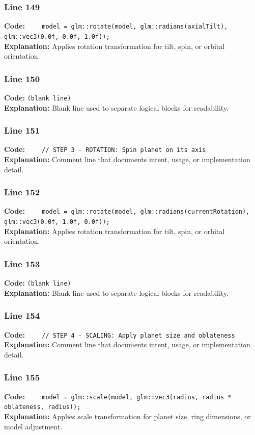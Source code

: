 \documentclass[11pt,a4paper]{article}
\begin{document}
\subsubsection*{Line 149}
\textbf{Code:} \verb|    model = glm::rotate(model, glm::radians(axialTilt), glm::vec3(0.0f, 0.0f, 1.0f));|\\
\textbf{Explanation:} Applies rotation transformation for tilt, spin, or orbital orientation.

\subsubsection*{Line 150}
\textbf{Code:} \texttt{(blank line)}\\
\textbf{Explanation:} Blank line used to separate logical blocks for readability.

\subsubsection*{Line 151}
\textbf{Code:} \verb|    // STEP 3 - ROTATION: Spin planet on its axis|\\
\textbf{Explanation:} Comment line that documents intent, usage, or implementation detail.

\subsubsection*{Line 152}
\textbf{Code:} \verb|    model = glm::rotate(model, glm::radians(currentRotation), glm::vec3(0.0f, 1.0f, 0.0f));|\\
\textbf{Explanation:} Applies rotation transformation for tilt, spin, or orbital orientation.

\subsubsection*{Line 153}
\textbf{Code:} \texttt{(blank line)}\\
\textbf{Explanation:} Blank line used to separate logical blocks for readability.

\subsubsection*{Line 154}
\textbf{Code:} \verb|    // STEP 4 - SCALING: Apply planet size and oblateness|\\
\textbf{Explanation:} Comment line that documents intent, usage, or implementation detail.

\subsubsection*{Line 155}
\textbf{Code:} \verb|    model = glm::scale(model, glm::vec3(radius, radius * oblateness, radius));|\\
\textbf{Explanation:} Applies scale transformation for planet size, ring dimensions, or model adjustment.
\end{document}
